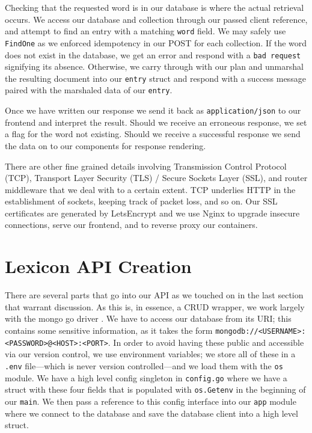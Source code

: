 \documentclass[11pt, twoside, reqno]{book}
\begin{document}
Checking that the requested word is in our database is where the actual retrieval occurs. We access our database and collection through our passed client reference, and attempt to find an entry with a matching \texttt{word} field. We may safely use \texttt{FindOne} as we enforced idempotency \cite{Idempote58:online} in our POST for each collection. If the word does not exist in the database, we get an error and respond with a \texttt{bad request} signifying its absence. Otherwise, we carry through with our plan and unmarshal the resulting document into our \texttt{entry} struct and respond with a success message paired with the marshaled data of our \texttt{entry}.

Once we have written our response we send it back as \texttt{application/json} to our frontend and interpret the result. Should we receive an erroneous response, we set a flag for the word not existing. Should we receive a successful response we send the data on to our components for response rendering.

There are other fine grained details involving Transmission Control Protocol (TCP), Transport Layer Security (TLS) / Secure Sockets Layer (SSL), and router middleware that we deal with to a certain extent. TCP underlies HTTP in the establishment of sockets, keeping track of packet loss, and so on. Our SSL certificates are generated by LetsEncrypt \cite{LetsEncr62:online} and we use Nginx \cite{NGINXHig46:online} to upgrade insecure connections, serve our frontend, and to reverse proxy our containers.

\section{Lexicon API Creation}

There are several parts that go into our API as we touched on in the last section that warrant discussion. As this is, in essence, a CRUD wrapper, we work largely with the mongo go driver \cite{mongoGoD17:online}. We have to access our database from its URI; this contains some sensitive information, as it takes the form \texttt{mongodb://<USERNAME>:<PASSWORD>@<HOST>:<PORT>}. In order to avoid having these public and accessible via our version control, we use environment variables; we store all of these in a \texttt{.env} file—which is never version controlled—and we load them with the \texttt{os} module. We have a high level config singleton in \texttt{config.go} where we have a struct with these four fields that is populated with \texttt{os.Getenv} in the beginning of our \texttt{main}. We then pass a reference to this config interface into our \texttt{app} module where we connect to the database and save the database client into a high level struct.
\end{document}
